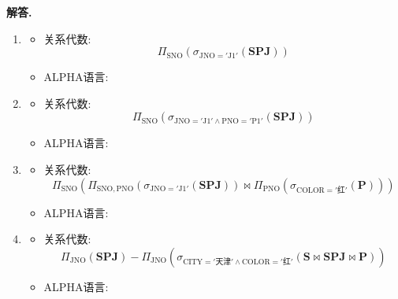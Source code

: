 \documentclass[12pt, oneside]{ctexart}
\numberwithin{figure}{section}
\numberwithin{table}{section}
\newenvironment{solution}{\par\noindent\textbf{解答. }}{\par}
\begin{document}
\begin{solution}
    \begin{enumerate}[(1)]
        \item
        \begin{itemize}
            \item 关系代数:
                  $$\Pi_{\mathrm{SNO}}(\sigma_{\mathrm{JNO} = '\mathrm{J1}'}(\mathbf{SPJ}))$$
            \item ALPHA语言:
                
        \end{itemize}
        \item
        \begin{itemize}
            \item 关系代数:
                  $$\Pi_{\mathrm{SNO}}(\sigma_{\mathrm{JNO} = '\mathrm{J1}' \land \mathrm{PNO} = '\mathrm{P1}'}(\mathbf{SPJ}))$$
            \item ALPHA语言:
                
        \end{itemize}
        \item
        \begin{itemize}
            \item 关系代数:
                  $$\Pi_{\mathrm{SNO}}(\Pi_{\mathrm{SNO}, \mathrm{PNO}}(\sigma_{\mathrm{JNO} = '\mathrm{J1}'}(\mathbf{SPJ})) \bowtie \Pi_{\mathrm{PNO}}(\sigma_{\mathrm{COLOR} = '\text{红}'}(\mathbf{P})))$$
            \item ALPHA语言:
                
        \end{itemize}
        \item
        \begin{itemize}
            \item 关系代数:
            $$\Pi_{\mathrm{JNO}}(\mathbf{SPJ}) - \Pi_{\mathrm{JNO}}(\sigma_{\mathrm{CITY} = '\text{天津}' \land \mathrm{COLOR} = '\text{红}'}(\mathbf{S} \bowtie \mathbf{SPJ} \bowtie \mathbf{P}))$$
            \item ALPHA语言:

\end{itemize}
\end{enumerate}
\end{solution}
\end{document}
